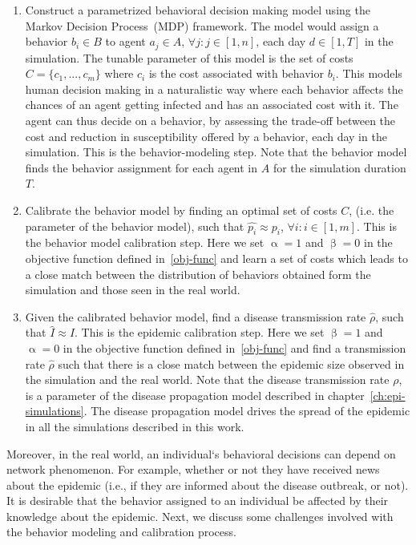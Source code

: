 \documentclass[doublespace]{VTthesis}
\begin{document}
    \begin{enumerate}
        \item Construct a parametrized behavioral decision making model using the Markov Decision Process~(MDP) framework. The model would assign a behavior $b_i \in B$ to agent $a_j \in A$, $\forall j : j \in [1, n]$, each day $d \in [1, T]$ in the simulation. The tunable parameter of this model is the set of costs $C = \{c_1, ..., c_m\}$ where $c_i$ is the cost associated with behavior $b_i$. This models human decision making in a naturalistic way where each behavior affects the chances of an agent getting infected and has an associated cost with it. The agent can thus decide on a behavior, by assessing the trade-off between the cost and reduction in susceptibility offered by a behavior, each day in the simulation. This is the behavior-modeling step. Note that the behavior model finds the behavior assignment for each agent in $A$ for the simulation duration $T$.
        \item Calibrate the behavior model by finding an optimal set of costs $C$, (i.e. the parameter of the behavior model), such that $\hat{p_i} \approx p_i$, $\forall i : i \in [1, m]$. This is the behavior model calibration step. Here we set $\upalpha = 1$ and $\upbeta = 0$ in the objective function defined in~\ref{obj-func} and learn a set of costs which leads to a close match between the distribution of behaviors obtained form the simulation and those seen in the real world. 
        \item Given the calibrated behavior model, find a disease transmission rate $\hat{\rho}$, such that $\hat{I} \approx I$. This is the epidemic calibration step. Here we set $\upbeta = 1$ and $\upalpha = 0$ in the objective function defined in~\ref{obj-func} and find a transmission rate $\hat{\rho}$ such that there is a close match between the epidemic size observed in the simulation and the real world. Note that the disease transmission rate $\rho$, is a parameter of the disease propagation model described in chapter~\ref{ch:epi-simulations}. The disease propagation model drives the spread of the epidemic in all the simulations described in this work.
    \end{enumerate}
    
    Moreover, in the real world, an individual`s behavioral decisions can depend on network phenomenon. For example, whether or not they have received news about the epidemic (i.e., if they are informed about the disease outbreak, or not). It is desirable that the behavior assigned to an individual be affected by their knowledge about the epidemic. Next, we discuss some challenges involved with the behavior modeling and calibration process. 
    
\end{document}

